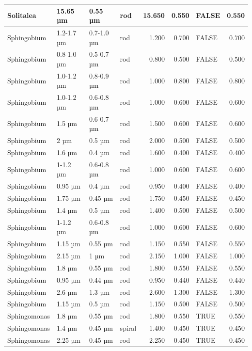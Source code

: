 \documentclass[
]{article}
\begin{document}
\begin{table}
\begin{tabular}{l|l|l|l|r|r|l|r}
\hline
Solitalea & 15.65 µm & 0.55 µm & rod & 15.650 & 0.550 & FALSE & 0.550\\
\hline
Sphingobium & 1.2-1.7 µm & 0.7-1.0 µm & rod & 1.200 & 0.700 & FALSE & 0.700\\
\hline
Sphingobium & 0.8-1.0 µm & 0.5-0.7 µm & rod & 0.800 & 0.500 & FALSE & 0.500\\
\hline
Sphingobium & 1.0-1.2 µm & 0.8-0.9 µm & rod & 1.000 & 0.800 & FALSE & 0.800\\
\hline
Sphingobium & 1.0-1.2 µm & 0.6-0.8 µm & rod & 1.000 & 0.600 & FALSE & 0.600\\
\hline
Sphingobium & 1.5 µm & 0.6-0.7 µm & rod & 1.500 & 0.600 & FALSE & 0.600\\
\hline
Sphingobium & 2 µm & 0.5 µm & rod & 2.000 & 0.500 & FALSE & 0.500\\
\hline
Sphingobium & 1.6 µm & 0.4 µm & rod & 1.600 & 0.400 & FALSE & 0.400\\
\hline
Sphingobium & 1-1.2 µm & 0.6-0.8 µm & rod & 1.000 & 0.600 & FALSE & 0.600\\
\hline
Sphingobium & 0.95 µm & 0.4 µm & rod & 0.950 & 0.400 & FALSE & 0.400\\
\hline
Sphingobium & 1.75 µm & 0.45 µm & rod & 1.750 & 0.450 & FALSE & 0.450\\
\hline
Sphingobium & 1.4 µm & 0.5 µm & rod & 1.400 & 0.500 & FALSE & 0.500\\
\hline
Sphingobium & 1-1.2 µm & 0.6-0.8 µm & rod & 1.000 & 0.600 & FALSE & 0.600\\
\hline
Sphingobium & 1.15 µm & 0.55 µm & rod & 1.150 & 0.550 & FALSE & 0.550\\
\hline
Sphingobium & 2.15 µm & 1 µm & rod & 2.150 & 1.000 & FALSE & 1.000\\
\hline
Sphingobium & 1.8 µm & 0.55 µm & rod & 1.800 & 0.550 & FALSE & 0.550\\
\hline
Sphingobium & 0.95 µm & 0.44 µm & rod & 0.950 & 0.440 & FALSE & 0.440\\
\hline
Sphingobium & 2.6 µm & 1.3 µm & rod & 2.600 & 1.300 & FALSE & 1.300\\
\hline
Sphingobium & 1.15 µm & 0.5 µm & rod & 1.150 & 0.500 & FALSE & 0.500\\
\hline
Sphingomonas & 1.8 µm & 0.55 µm & rod & 1.800 & 0.550 & TRUE & 0.550\\
\hline
Sphingomonas & 1.4 µm & 0.45 µm & spiral & 1.400 & 0.450 & TRUE & 0.450\\
\hline
Sphingomonas & 2.25 µm & 0.45 µm & rod & 2.250 & 0.450 & TRUE & 0.450\\

\end{tabular}
\end{table}
\end{document}
